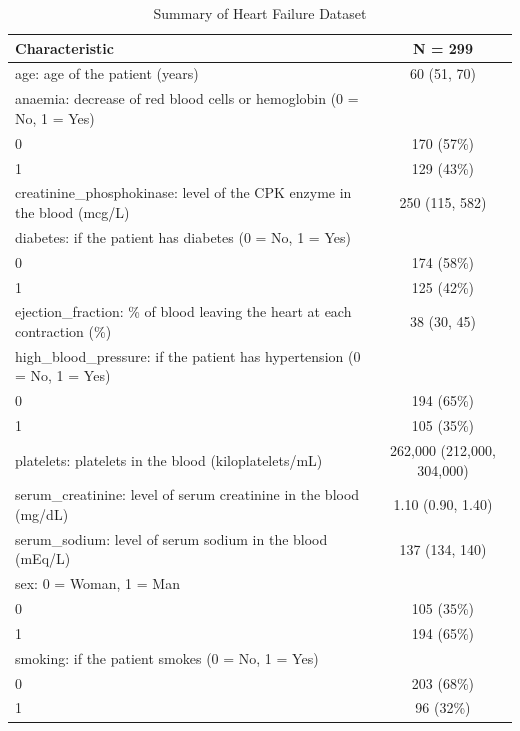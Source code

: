\documentclass[
  letterpaper,
  DIV=11,
  numbers=noendperiod]{scrartcl}
\begin{document}
\begin{table}

\caption{Summary of Heart Failure Dataset}
\centering
\begin{tabular}[t]{lc}
\toprule
\textbf{Characteristic} & \textbf{N = 299}\\
\midrule
age: age of the patient (years) & 60 (51, 70)\\
anaemia: decrease of red blood cells or hemoglobin (0 = No, 1 = Yes) & \\
\hspace{1em}0 & 170 (57\%)\\
\hspace{1em}1 & 129 (43\%)\\
creatinine\_phosphokinase: level of the CPK enzyme in the blood (mcg/L) & 250 (115, 582)\\
\addlinespace
diabetes: if the patient has diabetes (0 = No, 1 = Yes) & \\
\hspace{1em}0 & 174 (58\%)\\
\hspace{1em}1 & 125 (42\%)\\
ejection\_fraction: \% of blood leaving the heart at each contraction (\%) & 38 (30, 45)\\
high\_blood\_pressure: if the patient has hypertension (0 = No, 1 = Yes) & \\
\addlinespace
\hspace{1em}0 & 194 (65\%)\\
\hspace{1em}1 & 105 (35\%)\\
platelets: platelets in the blood (kiloplatelets/mL) & 262,000 (212,000, 304,000)\\
serum\_creatinine: level of serum creatinine in the blood (mg/dL) & 1.10 (0.90, 1.40)\\
serum\_sodium: level of serum sodium in the blood (mEq/L) & 137 (134, 140)\\
\addlinespace
sex: 0 = Woman, 1 = Man & \\
\hspace{1em}0 & 105 (35\%)\\
\hspace{1em}1 & 194 (65\%)\\
smoking: if the patient smokes (0 = No, 1 = Yes) & \\
\hspace{1em}0 & 203 (68\%)\\
\addlinespace
\hspace{1em}1 & 96 (32\%)\\

\end{tabular}
\end{table}
\end{document}
